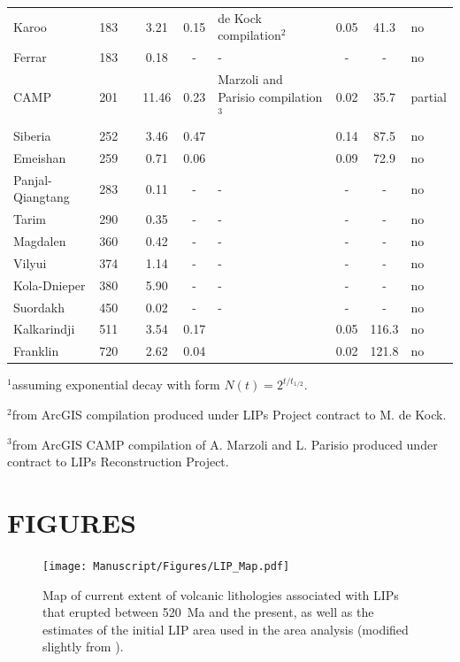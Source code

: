 \documentclass[11pt,letterpaper]{article}
\begin{document}
\begin{table}[h!]
{\begin{tabular}{lc>{\raggedright}p{4cm}cc>{\raggedright}p{4cm}ccl}
Karoo & 183 & \cite{Burgess2015a} & 3.21 & 0.15 & de Kock compilation$^{2}$ & 0.05 & 41.3 & no \\
Ferrar & 183 & \cite{Burgess2015a} & 0.18 & - & - & - & - & no \\
CAMP & 201 & \cite{Blackburn2013a} & 11.46 & 0.23 & Marzoli and Parisio compilation$^{3}$ & 0.02 & 35.7 & partial \\
Siberia & 252 & \cite{Burgess2015b} & 3.46 & 0.47 & \cite{Coffin2006a} & 0.14 & 87.5 & no \\
Emeishan & 259 & \cite{Zhou2002a} & 0.71 & 0.06 & \cite{Coffin2006a} & 0.09 & 72.9 & no \\
Panjal-Qiangtang & 283 & \cite{Zhai2013a} & 0.11 & - & - & - & - & no \\
Tarim & 290 & \cite{Xu2014a} & 0.35 & - & - & - & - & no \\
Magdalen & 360 & \cite{Brendan_Murphy1999a} & 0.42 & - & - & - & - & no \\
Vilyui & 374 & \cite{Ricci2013a} & 1.14 & - & - & - & - & no \\
Kola-Dnieper & 380 & \cite{Arzamastsev2014a} & 5.90 & - & - & - & - & no \\
Suordakh & 450 & \cite{Khudoley2013a} & 0.02 & - & - & - & - & no \\
Kalkarindji & 511 & \cite{Jourdan2014a} & 3.54 & 0.17 & \cite{Thorne2014a} & 0.05 & 116.3 & no \\
Franklin & 720 & \cite{Denyszyn2009a} & 2.62 & 0.04 & \cite{Buchan2004a} & 0.02 & 121.8 & no \\
\bottomrule
\end{tabular}
}
\begin{tablenotes}
$^{1}$assuming exponential decay with form $N(t) = 2^{t/t_{1/2}}$.

$^{2}$from ArcGIS compilation produced under LIPs Project contract to M. de Kock.

$^{3}$from ArcGIS CAMP compilation of A. Marzoli and L. Parisio produced under contract to LIPs Reconstruction Project.
\end{tablenotes}
\label{tab:LIPs}
\end{table}

\clearpage
\newpage

\section*{FIGURES}

\begin{figure}[h!]
\begin{center}
	\texttt{[image: Manuscript/Figures/LIP\_Map.pdf]}
	\caption{Map of current extent of volcanic lithologies associated with LIPs that erupted between 520~Ma and the present, as well as the estimates of the initial LIP area used in the area analysis (modified slightly from \citealp{Ernst2017a}).}
	\label{fig:LIP_map}
\end{center}
\end{figure}
\end{document}
